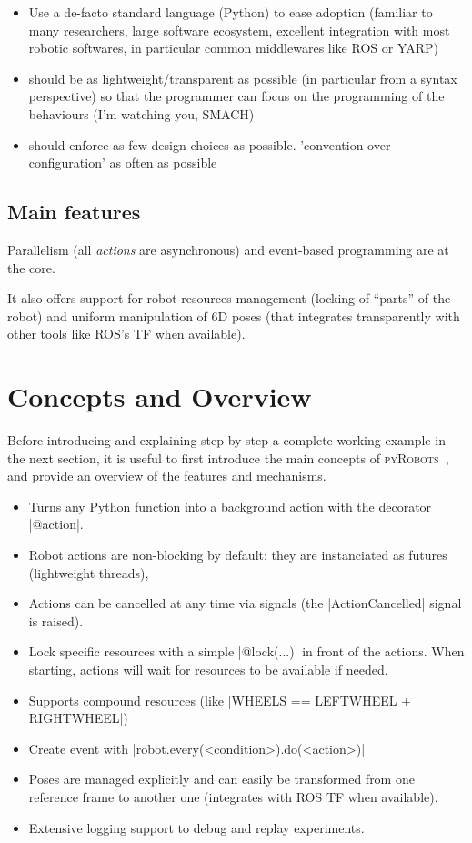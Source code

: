 \documentclass[a4paper, 10pt, conference]{ieeeconf}      %
\newcommand{\pyRobots}{\textsc{pyRobots}\ }
\begin{document}
\begin{itemize}
    \item Use a de-facto standard language (Python) to ease adoption (familiar to
        many researchers, large software ecosystem, excellent integration with
        most robotic softwares, in particular common middlewares like ROS or
        YARP)
    \item should be as lightweight/transparent as possible (in particular from a
        syntax perspective) so that the
        programmer can focus on the programming of the behaviours (I'm
        watching you, SMACH)
    \item should enforce as few design choices as possible. 'convention over
        configuration' as often as possible
\end{itemize}

\subsection{Main features}

Parallelism (all \emph{actions} are asynchronous) and event-based programming
are at the core.

It also offers support for robot resources management (locking of ``parts'' of
the robot) and uniform manipulation of 6D poses (that integrates transparently
with other tools like ROS's TF when available).

\section{Concepts and Overview}

Before introducing and explaining step-by-step a complete working example in the next
section, it is useful to first introduce the main concepts of \pyRobots, and
provide an overview of the features and mechanisms.

\begin{itemize}
    \item Turns any Python function into a background action with the decorator
        \python|@action|.
    \item Robot actions are non-blocking by default: they are instanciated as
        futures (lightweight threads),
    \item Actions can be cancelled at any time via signals (the
        \python|ActionCancelled| signal is raised).
    \item Lock specific resources with a simple \python|@lock(...)| in front of the
        actions. When starting, actions will wait for resources to be
        available if needed.
    \item Supports compound resources (like \python|WHEELS == LEFTWHEEL + RIGHTWHEEL|)
    \item Create event with \python|robot.every(<condition>).do(<action>)|
    \item Poses are managed explicitly and can easily be
        transformed from one reference frame to another one
        (integrates with ROS TF when available).
    \item Extensive logging support to debug and replay
        experiments.
\end{itemize}
\end{document}

